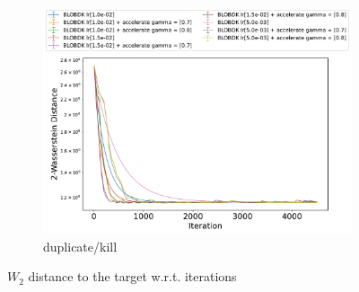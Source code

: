 \begin{figure}
\begin{subfigure}[b]{0.35\textwidth}
        \includegraphics[width=\textwidth]{experiment_figure/GMM/demo_w2_BlobDK_acce_sg.pdf}
        \caption{duplicate/kill }
        \label{fig:image3}
    \end{subfigure}
    \caption{$W_2$ distance to the target w.r.t. iterations}
    \label{fig1:entire_figure}
\end{figure}








